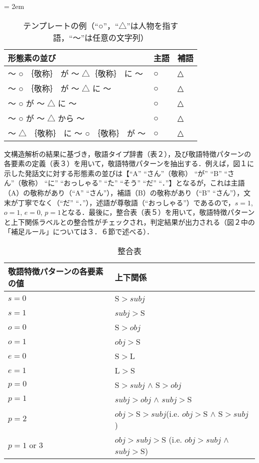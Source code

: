 \begin{table}[htbp]
\begin{center} 
\caption{テンプレートの例（``○''，``△''は人物を指す語，``〜''は任意の文字列）} 
\label{tbl:table4} 
\tabcolsep = 2em
\begin{tabular}{lll} 
\hline 
形態素の並び&主語&補語\\ 
\hline
〜 ○ ｛敬称｝ が 〜 △｛敬称｝ に 〜&○&△\\
〜 ○ ｛敬称｝ が 〜 △ に 〜&○&△\\
〜 ○ が 〜 △ に 〜& ○&△\\
〜 ○ が 〜 △ から 〜& ○&△\\
〜 △ ｛敬称｝ に 〜 ○ ｛敬称｝ が 〜&○&△\\
\hline 
\end{tabular} 
\end{center} 
\end{table} 

文構造解析の結果に基づき，敬語タイプ辞書（表２），及び敬語特徴パターンの各要素の定義（表３）を用いて，敬語特徴パターンを抽出する．例えば，図１に示した発話文に対する形態素の並びは【``A'' ``さん''（敬称） ``が'' ``B'' ``さん''（敬称） ``に'' ``おっしゃる'' ``た'' ``そう'' ``だ'' ``．''】となるが，これは主語（A）の敬称があり（``A'' ``さん''），補語（B）の敬称があり（``B'' ``さん''），文末が丁寧でなく（``だ'' ``．''），述語が尊敬語（``おっしゃる''）であるので，$s=1$, $o=1$, $e=0$, $p=1$となる．最後に，整合表（表５）を用いて，敬語特徴パターンと上下関係ラベルとの整合性がチェックされ，判定結果が出力される（図２中の「補足ルール」については３．６節で述べる）．

\begin{table}[htbp]
\begin{center} 
\caption{整合表} 
\label{tbl:table5} 
\begin{tabular}{ll} 
\hline 
敬語特徴パターンの各要素の値 & 上下関係\\ 
\hline
$s=0$&S$>subj$\\
$s=1$&$subj>$S\\
\hline 
$o=0$&S$>obj$\\
$o=1$&$obj>$S\\
\hline 
$e=0$&S$>$L\\
$e=1$&L$>$S\\
\hline 
$p=0$&S$>subj$ $\wedge$ S$>obj$\\
$p=1$&$subj>obj$ $\wedge$ $subj>$S\\
$p=2$&$obj>$S$>subj$(i.e. $obj>$S $\wedge$ S$>subj$)\\
\hline 
$p=1$ or 3&$obj>subj>$S (i.e. $obj>subj$ $\wedge$ $subj>$S)\\
\hline 
\end{tabular} 
\end{center} 
\end{table} 

